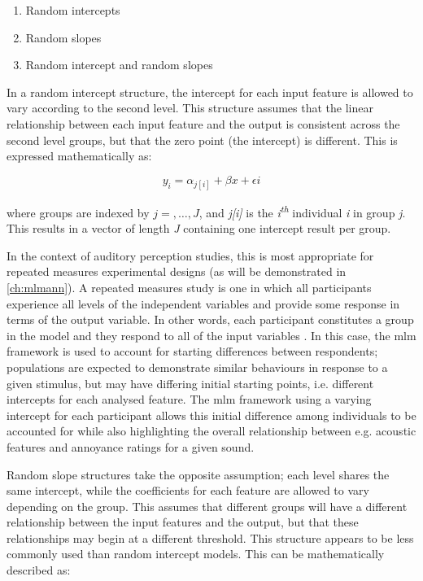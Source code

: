 \begin{enumerate}
  \item Random intercepts
  \item Random slopes
  \item Random intercept and random slopes
\end{enumerate}

In a random intercept structure, the intercept for each input feature is allowed to vary according to the second level. This structure assumes that the linear relationship between each input feature and the output is consistent across the second level groups, but that the zero point (the intercept) is different. This is expressed mathematically \citep{Gelman2006Multilevel} as:

\begin{equation}
  y_i = \alpha_{j[i]} + \beta x + \epsilon{i}
\end{equation}

where groups are indexed by $j = , \ldots, J$, and \emph{j[i]} is the \emph{i\textsuperscript{th}} individual \emph{i} in group \emph{j}. This results in a vector of length \emph{J} containing one intercept result per group.

In the context of auditory perception studies, this is most appropriate for repeated measures experimental designs (as will be demonstrated in \cref{ch:mlmann}). A repeated measures study is one in which all participants experience all levels of the independent variables and provide some response in terms of the output variable. In other words, each participant constitutes a group in the model and they respond to all of the input variables \citep{Kristjansson2007Multilevel}. In this case, the \gls{mlm} framework is used to account for starting differences between respondents; populations are expected to demonstrate similar behaviours in response to a given stimulus, but may have differing initial starting points, i.e. different intercepts for each analysed feature. The \gls{mlm} framework using a varying intercept for each participant allows this initial difference among individuals to be accounted for while also highlighting the overall relationship between e.g. acoustic features and annoyance ratings for a given sound. 

Random slope structures take the opposite assumption; each level shares the same intercept, while the coefficients for each feature are allowed to vary depending on the group. This assumes that different groups will have a different relationship between the input features and the output, but that these relationships may begin at a different threshold. This structure appears to be less commonly used than random intercept models. This can be mathematically described as:

